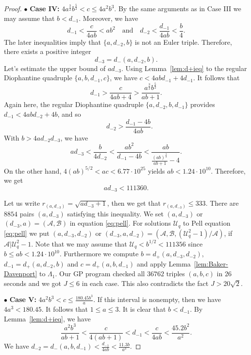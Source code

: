 \documentclass{amsart}
\theoremstyle{definition}
\begin{document}
\begin{proof}
\vspace{5mm}


\noindent $\bullet$ \textbf{Case IV:} $4a^{\frac{3}{2}}b^{\frac{5}{2}}<c\le4a^2b^3$. By the same arguments as in Case III we may assume that $b<d_{-1}$. Moreover, we have
$$
d_{-1} < \frac{c}{4ab} <  ab^2 \quad \mbox{and}\quad 
d_{-2} < \frac{d_{-1}}{4ab}<\frac{b}{4}.
$$
The later inequalities imply that $\{a,d_{-2},b\}$ is not an Euler triple. Therefore, there exists a positive integer $$d_{-3}= d_{-}(a,d_{-2},b).$$  
Let's estimate the upper bound of $ad_{-3}$. Using Lemma~\ref{lem:d+ieq} to the regular Diophantine quadruple $\{a,b,d_{-1},c\}$, we have $c<4abd_{-1}+4d_{-1}$. It follows that 
$$
d_{-1}>\frac{c}{4ab+4}>\frac{a^{\frac{3}{2}}b^{\frac{5}{2}}}{ab+1}.
$$
Again here, the regular  Diophantine quadruple $\{a,d_{-2},b,d_{-1}\}$ provides $d_{-1}<4abd_{-2}+4b$, and so
$$
\quad d_{-2}>\frac{d_{-1}-4b}{4ab}.
$$
With $b>4ad_{-2}d_{-3}$, we have 
$$
ad_{-3}<\frac{b}{4d_{-2}}<\frac{ab^2}{d_{-1}-4b}<\frac{ab}{\frac{(ab)^{\frac{3}{2}}}{ab+1}-4}. 
$$
On the other hand, $4(ab)^{5/2}<ac<6.77\cdot 10^{25}$ yields $ab<1.24\cdot 10^{10}$. Therefore, we get
$$
ad_{-3} < 111360.  
$$

Let us write $r_{(a,d_{-3})}=\sqrt{ad_{-3}+1}$, then we get that $r_{(a,d_{-3})}\le 333$.
There are $8854$ pairs $(a,d_{-3})$ satisfying
this inequality. We set $(a,d_{-3})$ or $(d_{-3},a) = (\mathcal{A}, \mathcal{B})$ in equation \eqref{eq:pell}.
For solutions $\mathcal{U}_q$ to Pell equation \eqref{eq:pell} we put $(a,d_{-3},d_{-2})$ or $(d_{-3},a,d_{-2})=(\mathcal{A},\mathcal{B},(\mathcal{U}_q^2-1)/\mathcal{A})$,
if $\mathcal{A}|\mathcal{U}_q^2-1$. Note that we may assume that $\mathcal{U}_q<b^{1/2}<111356$ since $b\leq ab<1.24\cdot 10^{10}$.
Furthermore we compute $b=d_{+}(a,d_{-3},d_{-2})$, $d_{-1}=d_{+}(a,d_{-2},b)$ and $c=d_{+}(a,b,d_{-1})$ and
apply Lemma~\ref{lem:Baker-Davenport} to $\Lambda_1$. Our GP program checked all $36762$ triples $(a,b,c)$ in $26$ seconds and we got $J\le 6$ in each case.
This also contradicts the fact $J>20\sqrt{2}$.



\vspace{5mm}



\noindent $\bullet$ \textbf{Case V:}  $ 4a^2b^3<c\le \frac{180.45b^3}{a}$. If this interval is nonempty, then we have $4a^3<180.45$. It follows that $1\le a\le3$. It is clear that $b<d_{-1}$. By Lemma~\ref{lem:d+ieq}, we have 
\begin{equation}\label{eq:case5-1}
\frac{a^2b^3}{ab+1}<\frac{c}{4(ab+1)}<d_{-1} < \frac{c}{4ab}<\frac{45.2b^2}{a^2}. 
\end{equation}
We have $d_{-2}=d_{-}(a,b,d_{-1})<\frac{d_{-1}}{4ab}<\frac{11.3b}{a^3}$.   


\end{proof}
\end{document}
